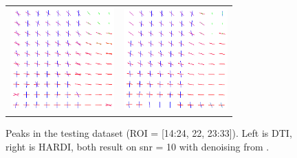 \documentclass[9pt,conference,a4paper]{IEEEtran}
\begin{document}
\begin{figure}
\centering
\begin{tabular}{c  c}
	\includegraphics[width=40mm,height=40mm]{dti_slice=22_sel=33_NC=3_iso=1_fr=0_snr=10_type=6_white.png} & \includegraphics[width=40mm,height=40mm]{hardi_slice=22_sel=33_NC=3_iso=1_fr=0_snr=10_type=6_white.png}\\
\end{tabular}
\caption{Peaks in the testing dataset (ROI = [14:24, 22, 23:33]). Left is DTI, right is HARDI, both result on snr = 10 with denoising from \cite{manjon-coupe:10}.}
\end{figure}






\
\end{document}
